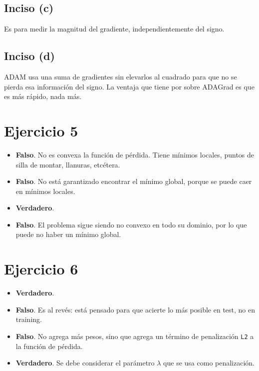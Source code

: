 \documentclass[12pt, a4paper]{article}
\begin{document}
        \subsection*{Inciso (c)}
            \noindent Es para medir la magnitud del gradiente, independientemente del signo.
        \subsection*{Inciso (d)}
            \noindent ADAM usa una suma de gradientes sin elevarlos al cuadrado para que no se pierda esa información del signo. La ventaja que tiene por sobre ADAGrad es que es más rápido, nada más.
    \section*{Ejercicio 5}
        \begin{itemize}
            \item \textbf{Falso}. No es convexa la función de pérdida. Tiene mínimos locales, puntos de silla de montar, llanuras, etcétera.
            \item \textbf{Falso}. No está garantizado encontrar el mínimo global, porque se puede caer en mínimos locales.
            \item \textbf{Verdadero}.
            \item \textbf{Falso}. El problema sigue siendo no convexo en todo su dominio, por lo que puede no haber un mínimo global.
        \end{itemize}
    \section*{Ejercicio 6}
        \begin{itemize}
            \item \textbf{Verdadero}.
            \item \textbf{Falso}. Es al revés: está pensado para que acierte lo más posible en test, no en training.
            \item \textbf{Falso}. No agrega más pesos, sino que agrega un término de penalización \texttt{L2} a la función de pérdida.
            \item \textbf{Verdadero}. Se debe considerar el parámetro $\lambda$ que se usa como penalización.
        \end{itemize}
\end{document}
